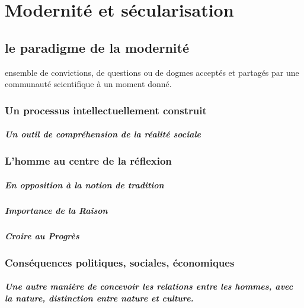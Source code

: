 \chapter{Modernité et sécularisation}

\section{le paradigme de la modernité}

\begin{Def}[Paradigme] ensemble de convictions, de questions ou de dogmes acceptés et partagés par une
communauté scientifique à un moment donné.
\end{Def}

\subsection{Un processus intellectuellement construit}
\paragraph{Un outil de compréhension de la réalité sociale}


\subsection{L’homme au centre de la réflexion}

\paragraph{En opposition à la notion de tradition}
\paragraph{Importance de la Raison} 
\paragraph{Croire au Progrès} 

\subsection{Conséquences politiques, sociales, économiques}

\paragraph{Une autre manière de concevoir les relations entre les hommes, avec la nature, distinction entre
nature et culture.} 
